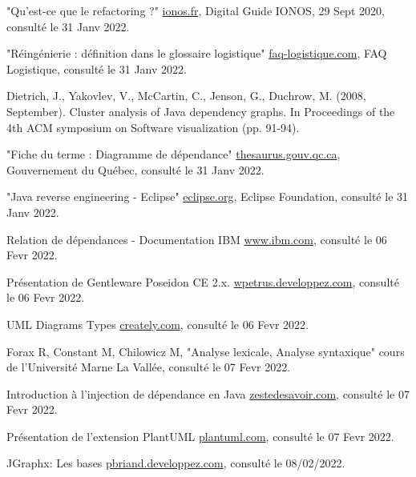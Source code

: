 \documentclass{article}
\begin{document}
\begin{thebibliography}{9}
 "Qu'est-ce que le refactoring ?" \href{https://www.ionos.fr/digitalguide/sites-internet/developpement-web/quest-ce-que-le-refactoring/}{ionos.fr}, Digital Guide IONOS, 29 Sept 2020, consulté le 31 Janv 2022.

 "Réingénierie : définition dans le glossaire logistique"
\href{https://www.faq-logistique.com/Definition-Reingenierie.htm}{faq-logistique.com}, FAQ Logistique, consulté le 31 Janv 2022.

Dietrich, J., Yakovlev, V., McCartin, C., Jenson, G., Duchrow, M. (2008, September). Cluster analysis of Java dependency graphs. In Proceedings of the 4th ACM symposium on Software visualization (pp. 91-94).

"Fiche du terme : Diagramme de dépendance"
\href{http://www.thesaurus.gouv.qc.ca/tag/terme.do?id=MDL420}{thesaurus.gouv.qc.ca}, Gouvernement du Québec, consulté le 31 Janv 2022.

 "Java reverse engineering - Eclipse" \href{https://wiki.eclipse.org/Java_reverse_engineering}{eclipse.org}, Eclipse Foundation, consulté le 31 Janv 2022.

Relation de dépendances - Documentation IBM \href{https://www.ibm.com/docs/fr/rsm/7.5.0?topic=diagrams-dependency-relationships}{www.ibm.com}, consulté le 06 Fevr 2022.

Présentation de Gentleware Poseidon CE 2.x.
\href{https://wpetrus.developpez.com/uml/poseidon/}{wpetrus.developpez.com}, consulté le 06 Fevr 2022.

UML Diagrams Types
\href{https://creately.com/blog/diagrams/uml-diagram-types-examples/}{creately.com}, consulté le 06 Fevr 2022.

Forax R, Constant M, Chilowicz M, "Analyse lexicale, Analyse syntaxique" cours de l'Université Marne La Vallée, consulté le 07 Fevr 2022.

Introduction à l'injection de dépendance en Java
\href{https://zestedesavoir.com/tutoriels/309/introduction-a-linjection-de-dependances-en-java/}{zestedesavoir.com}, consulté le 07 Fevr 2022.

Présentation de l'extension PlantUML
\href{https://plantuml.com/fr/class-diagram}{plantuml.com}, consulté le 07 Fevr 2022.

JGraphx: Les bases
\href{https://pbriand.developpez.com/tutoriels/java/JGraphX/les-bases/#L2}{pbriand.developpez.com}, consulté le 08/02/2022.

\end{thebibliography}
\end{document}
